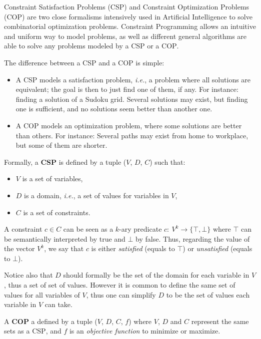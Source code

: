 \documentclass[journal]{IEEEtran}
\newcommand{\csp}{\textsc{CSP}\xspace}
\newcommand{\cop}{\textsc{COP}\xspace}
\newcommand{\ie}{\textit{i.e.}}
\begin{document}
Constraint  Satisfaction Problems  (\csp) and  Constraint Optimization
Problems  (\cop)   are  two  close  formalisms   intensively  used  in
Artificial  Intelligence  to   solve  combinatorial    optimization
problems. Constraint  Programming allows an intuitive  and uniform way
to model  problems, as  well as different  general algorithms  are able to
solve any problems modeled by a \csp or a \cop.

The difference between a \csp and a \cop is simple:
\begin{itemize}
\item A \csp  models a satisfaction problem, \ie, a  problem where all
  solutions are equivalent; the goal is then to just find one of them,
  if any. For  instance: finding a solution of a  Sudoku grid. Several
  solutions may exist, but finding one is sufficient, and no solutions
  seem better than another one.
\item A \cop models an  optimization problem, where some solutions are
  better than others.  For instance: Several paths may exist from home
  to workplace, but some of them are shorter.
\end{itemize}
Formally, a {\bf \csp} is defined by a tuple ($V$, $D$, $C$) such that:
\begin{itemize}
\item $V$ is a set of variables,
\item $D$ is a domain, \ie, a set of values for variables in $V$,
\item $C$ is a set of constraints.
\end{itemize}

A  constraint  $c   \in  C$  can  be  seen  as   a  $k$-ary  predicate
$c:~V^k\rightarrow\{\top,\bot\}$  where  $\top$  can  be  semantically
interpreted by true and $\bot$ by  false. Thus, regarding the value of
the vector $V^k$, we say that $c$ is either {\it satisfied} (equals to
$\top$) or {\it unsatisfied} (equals to $\bot$).

Notice also that $D$ should formally be the set of the domain for each
variable in $V$, thus a set of  set of values. However it is common to
define the same set  of values for all variables of  $V$, thus one can
simplify $D$ to be the set of values each variable in $V$ can take.

A {\bf \cop} a defined by a tuple ($V$, $D$, $C$, $f$) where $V$, $D$ and
$C$ represent the same sets as a \csp, and $f$ is an {\it objective
function} to minimize  or maximize.
\end{document}
